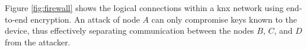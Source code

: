 Figure \ref{fig:firewall} shows the logical connections within a \gls{knx} network using end-to-end encryption. An 
attack of node $A$ can only compromise keys known to the device, thus effectively separating communication between the nodes $B$, $C$, and $D$ from
the attacker.
% 
% 
% 
\\
\\
